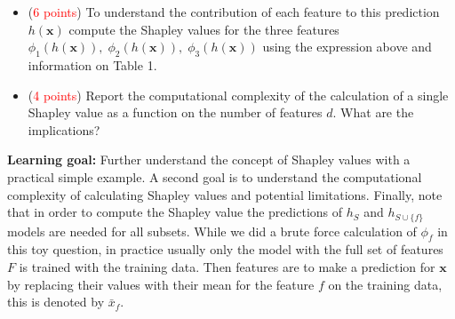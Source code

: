 \begin{itemize}[(a)]
  \item (\textcolor{red}{6 points}) To understand the contribution of each feature to this prediction $h(\mathbf{x})$ compute the Shapley values for the three features $\phi_{1}(h(\mathbf{x})),\; \phi_{2}(h(\mathbf{x})),\; \phi_{3}(h(\mathbf{x}))$ using the expression above and information on Table 1. 
\end{itemize}

\begin{itemize}[(b)]
  \item (\textcolor{red}{4 points}) Report the computational complexity of the calculation of a single Shapley value as a function on the number of features $d$. What are the implications?
\end{itemize}

{\bf Learning goal:} Further understand the concept of Shapley values with a practical simple example. A second goal is to understand the computational complexity of calculating Shapley values and potential limitations.   Finally, note that in order to compute the Shapley value the predictions of $h_S$ and $h_{S \cup \{f\}}$ models are needed for all subsets. While we did a brute force calculation of $\phi_f$ in this toy question, in practice usually only the model with the full set of features $F$ is trained with the training data. Then features are  to make a prediction for $\mathbf{x}$ by replacing their values with their mean  for the feature $f$ on the training data, this is denoted by $\bar{x}_{f}$.